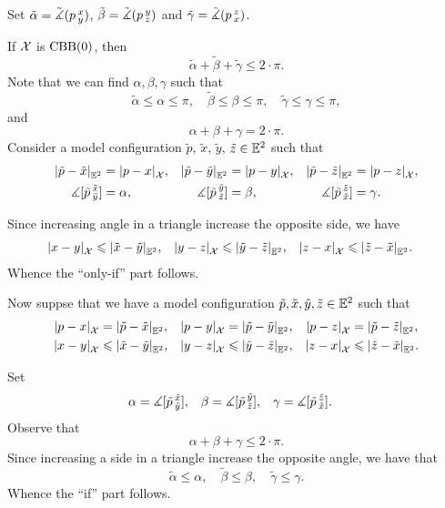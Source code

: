 Set $\tilde\alpha=\tilde\measuredangle(p\,{}^{x}_{y})$, $\tilde\beta=\tilde\measuredangle(p\,{}^{y}_{z})$ and $\tilde\gamma=\tilde\measuredangle(p\,{}^{z}_{x})$.

If $\mathcal{X}$ is $\mathrm{CBB}(0)$, then
\[\tilde\alpha+\tilde\beta+\tilde\gamma\le 2\cdot \pi.\]
Note that we can find $\alpha,\beta,\gamma$ such that 
\[
\tilde\alpha\le\alpha\le\pi,
\quad \tilde\beta\le\beta\le\pi,
\quad\tilde\gamma\le\gamma\le\pi,\]
and
\[\alpha+\beta+\gamma=2\cdot \pi.\]
Consider a model configuration $\tilde p$, $\tilde x$, $\tilde y$, $\tilde z\in\mathbb{E}^2$ such that 
\begin{align*}
\dist{\tilde p}{\tilde x}{\EE^2}&=\dist{p}{x}{\spc{X}},
&
\dist{\tilde p}{\tilde y}{\EE^2}&=\dist{p}{y}{\spc{X}},
&
\dist{\tilde p}{\tilde z}{\EE^2}&=\dist{p}{z}{\spc{X}},
\\
\mangle\hinge {\tilde p}{\tilde x}{\tilde y}&=\alpha,
&
\mangle\hinge {\tilde p}{\tilde y}{\tilde z}&=\beta,
&
\mangle\hinge {\tilde p}{\tilde z}{\tilde x}&=\gamma.
\end{align*}

Since increasing angle in a triangle increase the opposite side, we have 
\begin{align*}
\dist{x}{y}{\spc{X}}&\le\dist{\tilde x}{\tilde y}{\EE^2},
&
\dist{y}{z}{\spc{X}}&\le\dist{\tilde y}{\tilde z}{\EE^2},
&
\dist{z}{x}{\spc{X}}&\le\dist{\tilde z}{\tilde x}{\EE^2}.
\end{align*}
Whence the ``only-if'' part follows.

Now suppse that we have a model configuration $\tilde p,\tilde x,\tilde y,\tilde z\in\mathbb{E}^2$
such that 
\begin{align*}
\dist{p}{x}{\spc{X}}&=\dist{\tilde p}{\tilde x}{\EE^2},
&
\dist{p}{y}{\spc{X}}&=\dist{\tilde p}{\tilde y}{\EE^2},
&
\dist{p}{z}{\spc{X}}&=\dist{\tilde p}{\tilde z}{\EE^2},
\\
\dist{x}{y}{\spc{X}}&\le\dist{\tilde x}{\tilde y}{\EE^2},
&
\dist{y}{z}{\spc{X}}&\le\dist{\tilde y}{\tilde z}{\EE^2},
&
\dist{z}{x}{\spc{X}}&\le\dist{\tilde z}{\tilde x}{\EE^2}.
\end{align*}

Set
\begin{align*} 
\alpha&=\measuredangle[\tilde p\,{}^{\tilde x}_{\tilde y}],
&
\beta&=\measuredangle[\tilde p\,{}^{\tilde y}_{\tilde z}],
&
\gamma&=\measuredangle[\tilde p\,{}^{\tilde z}_{\tilde x}].
\end{align*}
Observe that 
\[\alpha+\beta+\gamma\le 2\cdot \pi.\]
Since increasing a side in a triangle increase the opposite angle, we have that
\[
\tilde\alpha\le\alpha,
\quad \tilde\beta\le\beta,
\quad\tilde\gamma\le\gamma.\]
Whence the ``if'' part follows.


